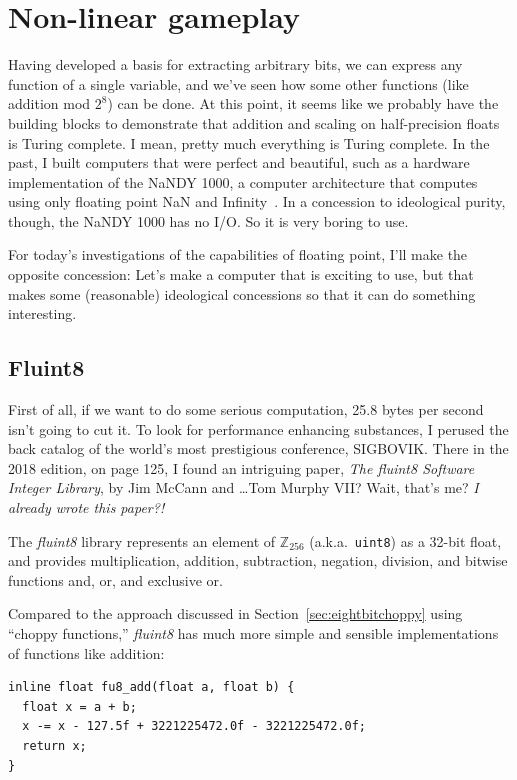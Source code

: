 \documentclass[twocolumn]{article}
\begin{document}
\section{Non-linear gameplay} \label{sec:sixtyfive}
Having developed a basis for extracting arbitrary bits, we can express
any function of a single variable, and we've seen how some other
functions (like addition mod $2^8$) can be done. At this point, it
seems like we probably have the building blocks to demonstrate that
addition and scaling on half-precision floats is Turing complete. I
mean, pretty much everything is Turing complete. In the past, I built
computers that were perfect and beautiful, such as a hardware
implementation of the NaNDY 1000, a computer architecture that
computes using only floating point NaN and
Infinity~\cite{murphy2019nan}. In a concession to ideological purity,
though, the NaNDY 1000 has no I/O. So it is very boring to use.

For today's investigations of the capabilities of floating point, I'll
make the opposite concession: Let's make a computer that is exciting
to use, but that makes some (reasonable) ideological concessions so that
it can do something interesting.

\subsection{Fluint8}

First of all, if we want to do some serious computation, 25.8 bytes
per second isn't going to cut it. To look for performance enhancing
substances, I perused the back catalog of the world's most prestigious
conference, SIGBOVIK. There in the 2018 edition, on page 125, I found
an intriguing paper, {\it The fluint8 Software Integer Library}, by
Jim McCann and \ldots Tom Murphy VII? Wait, that's me? {\large \em I already
wrote this paper?!}

The {\it fluint8} library represents an element of $\mathbb{Z}_{256}$
(a.k.a.~{\tt uint8}) as a 32-bit float, and provides multiplication,
addition, subtraction, negation, division, and bitwise functions and,
or, and exclusive or.

Compared to the approach discussed in Section~\ref{sec:eightbitchoppy}
using ``choppy functions,'' {\it fluint8} has much more simple and
sensible implementations of functions like addition:

\begin{lstlisting}
inline float fu8_add(float a, float b) {
  float x = a + b;
  x -= x - 127.5f + 3221225472.0f - 3221225472.0f;
  return x;
}
\end{lstlisting}
\end{document}
